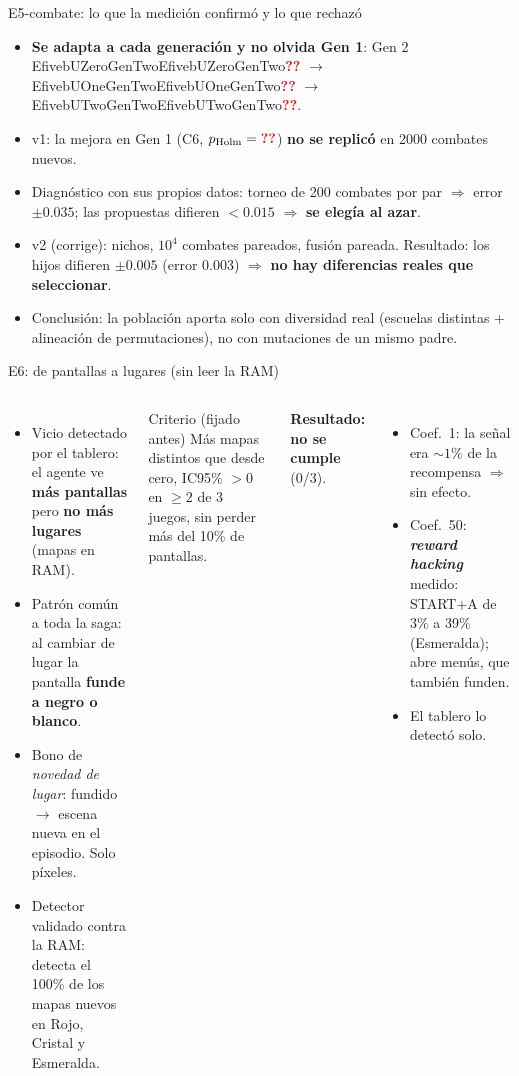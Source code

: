 \documentclass[aspectratio=169,11pt]{beamer}
\newcommand{\val}[1]{\ifcsname #1\endcsname\csname #1\endcsname\else\textbf{\textcolor{red}{??}}\fi}
\begin{document}
\begin{frame}{E5-combate: lo que la medición confirmó y lo que rechazó}
\small
\begin{itemize}
\item \textbf{Se adapta a cada generación y no olvida Gen 1}: Gen 2 \val{EfivebUZeroGenTwo} $\to$ \val{EfivebUOneGenTwo} $\to$ \val{EfivebUTwoGenTwo}.
\item v1: la mejora en Gen 1 (C6, $p_{\mathrm{Holm}}=\val{EfivebCSixP}$) \textbf{no se replicó} en 2000 combates nuevos.
\item Diagnóstico con sus propios datos: torneo de 200 combates por par $\Rightarrow$ error $\pm0.035$; las propuestas difieren $<0.015$ $\Rightarrow$ \textbf{se elegía al azar}.
\item v2 (corrige): nichos, $10^4$ combates pareados, fusión pareada. Resultado: los hijos difieren $\pm0.005$ (error $0.003$) $\Rightarrow$ \textbf{no hay diferencias reales que seleccionar}.
\item Conclusión: la población aporta solo con diversidad real (escuelas distintas + alineación de permutaciones), no con mutaciones de un mismo padre.
\end{itemize}
\end{frame}

\begin{frame}{E6: de pantallas a lugares (sin leer la RAM)}
\small
\begin{columns}[T]
\begin{itemize}
\item Vicio detectado por el tablero: el agente ve \textbf{más pantallas} pero \textbf{no más lugares} (mapas en RAM).
\item Patrón común a toda la saga: al cambiar de lugar la pantalla \textbf{funde a negro o blanco}.
\item Bono de \emph{novedad de lugar}: fundido $\to$ escena nueva en el episodio. Solo píxeles.
\item Detector validado contra la RAM: detecta el 100\% de los mapas nuevos en Rojo, Cristal y Esmeralda.
\end{itemize}
\begin{block}{Criterio (fijado antes)}
Más mapas distintos que desde cero, IC95\% $>0$ en $\geq2$ de 3 juegos, sin perder más del 10\% de pantallas.
\end{block}
\textbf{Resultado: no se cumple} (0/3).
\begin{itemize}
\item Coef.\ 1: la señal era ${\sim}1\%$ de la recompensa $\Rightarrow$ sin efecto.
\item Coef.\ 50: \textbf{\emph{reward hacking}} medido: START+A de 3\% a 39\% (Esmeralda); abre menús, que también funden.
\item El tablero lo detectó solo.
\end{itemize}
\end{columns}
\end{frame}
\end{document}

